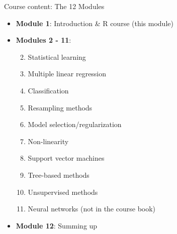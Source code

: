 \documentclass[10pt,ignorenonframetext,]{beamer}
\providecommand{\tightlist}{%
  \setlength{\itemsep}{0pt}\setlength{\parskip}{0pt}}
\begin{document}
\begin{frame}

\begin{block}{Course content: The 12 Modules}

\vspace{2mm}

\begin{itemize}
\tightlist
\item
  \textbf{Module 1}: Introduction \& R course (this module)
\end{itemize}

\vspace{2mm}

\begin{itemize}
\tightlist
\item
  \textbf{Modules 2 - 11}:

  \begin{enumerate}
  [1)]
  \setcounter{enumi}{1}
  \tightlist
  \item
    Statistical learning
  \item
    Multiple linear regression
  \item
    Classification
  \item
    Resampling methods
  \item
    Model selection/regularization
  \item
    Non-linearity
  \item
    Support vector machines
  \item
    Tree-based methods
  \item
    Unsupervised methods
  \item
    Neural networks (not in the course book)
  \end{enumerate}
\end{itemize}

\vspace{2mm}

\begin{itemize}
\tightlist
\item
  \textbf{Module 12}: Summing up
\end{itemize}

\end{block}

\end{frame}
\end{document}
